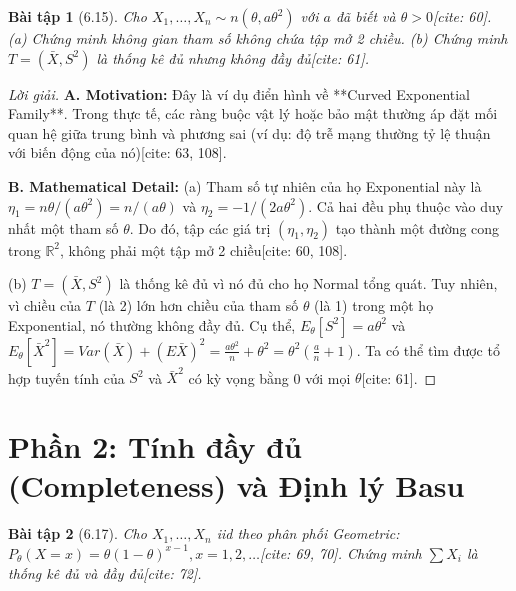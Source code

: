 \documentclass[8pt,a4paper]{article}
\newtheorem{exercise}{Bài tập}
\newenvironment{solution}{\begin{proof}[Lời giải]}{\end{proof}}
\begin{document}
\begin{exercise}[6.15]
Cho $X_1, \dots, X_n \sim n(\theta, a\theta^2)$ với $a$ đã biết và $\theta > 0$[cite: 60].
(a) Chứng minh không gian tham số không chứa tập mở 2 chiều.
(b) Chứng minh $T = (\bar{X}, S^2)$ là thống kê đủ nhưng không đầy đủ[cite: 61].
\end{exercise}

\begin{solution}
\textbf{A. Motivation:} Đây là ví dụ điển hình về **Curved Exponential Family**. Trong thực tế, các ràng buộc vật lý hoặc bảo mật thường áp đặt mối quan hệ giữa trung bình và phương sai (ví dụ: độ trễ mạng thường tỷ lệ thuận với biến động của nó)[cite: 63, 108].

\textbf{B. Mathematical Detail:}
(a) Tham số tự nhiên của họ Exponential này là $\eta_1 = n\theta / (a\theta^2) = n/(a\theta)$ và $\eta_2 = -1/(2a\theta^2)$. 
Cả hai đều phụ thuộc vào duy nhất một tham số $\theta$. Do đó, tập các giá trị $(\eta_1, \eta_2)$ tạo thành một đường cong trong $\mathbb{R}^2$, không phải một tập mở 2 chiều[cite: 60, 108].

(b) $T = (\bar{X}, S^2)$ là thống kê đủ vì nó đủ cho họ Normal tổng quát. Tuy nhiên, vì chiều của $T$ (là 2) lớn hơn chiều của tham số $\theta$ (là 1) trong một họ Exponential, nó thường không đầy đủ. 
Cụ thể, $E_\theta[S^2] = a\theta^2$ và $E_\theta[\bar{X}^2] = Var(\bar{X}) + (E\bar{X})^2 = \frac{a\theta^2}{n} + \theta^2 = \theta^2(\frac{a}{n} + 1)$.
Ta có thể tìm được tổ hợp tuyến tính của $S^2$ và $\bar{X}^2$ có kỳ vọng bằng 0 với mọi $\theta$[cite: 61].
\end{solution}


\section*{Phần 2: Tính đầy đủ (Completeness) và Định lý Basu}

\begin{exercise}[6.17]
Cho $X_1, \dots, X_n$ iid theo phân phối Geometric: $P_\theta(X=x) = \theta(1-\theta)^{x-1}, x=1,2,\dots$[cite: 69, 70]. Chứng minh $\sum X_i$ là thống kê đủ và đầy đủ[cite: 72].
\end{exercise}
\end{document}
